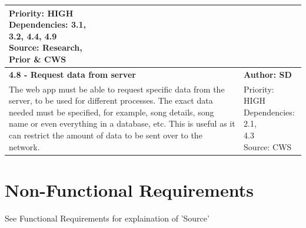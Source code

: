 \documentclass[10pt, notitlepage]{report}
\begin{document}
\begin{center}
\begin{longtable}{| p{13cm} | p{3cm} |}
\makecell{Priority: HIGH\\Dependencies: 3.1,\\3.2, 4.4, 4.9\\Source: Research,\\Prior \& CWS}\\
\hline
\textbf{4.8 -  Request data from server} & \textbf{Author: SD} \\
\hline
The web app must be able to request specific data from the server, to be used for different processes. The exact data needed must be specified, for example, song details, song name or even everything in a database, etc. This is useful as it can restrict the amount of data to be sent over to the network.&
\makecell{Priority: HIGH\\Dependencies: 2.1,\\4.3\\Source: CWS}\\
\hline

\end{longtable}

\end{center}

\section{Non-Functional Requirements}

See Functional Requirements for explaination of 'Source'
\end{document}
